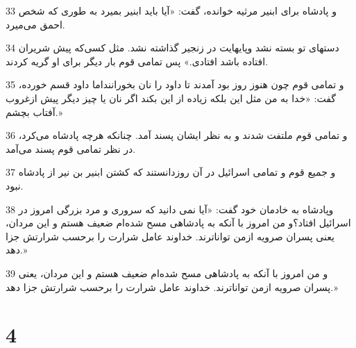 \par 33 و پادشاه برای ابنیر مرثیه خوانده، گفت: «آیا باید ابنیر بمیرد به طوری که شخص احمق می‌میرد.
\par 34 دستهای تو بسته نشد وپایهایت در زنجیر گذاشته نشد. مثل کسی‌که پیش شریران افتاده باشد افتادی.» پس تمامی قوم بار دیگر برای او گریه کردند.
\par 35 و تمامی قوم چون هنوز روز بود آمدند تا داود را نان بخوراننداما داود قسم خورده، گفت: «خدا به من مثل این بلکه زیاده از این بکند اگر نان یا چیز دیگر پیش ازغروب آفتاب بچشم.»
\par 36 و تمامی قوم ملتفت شدند و به نظر ایشان پسند آمد. چنانکه هر‌چه پادشاه می‌کرد، در نظر تمامی قوم پسند می‌آمد.
\par 37 و جمیع قوم و تمامی اسرائیل در آن روزدانستند که کشتن ابنیر بن نیر از پادشاه نبود.
\par 38 وپادشاه به خادمان خود گفت: «آیا نمی دانید که سروری و مرد بزرگی امروز در اسرائیل افتاد؟و من امروز با آنکه به پادشاهی مسح شده‌ام ضعیف هستم و این مردان، یعنی پسران صرویه ازمن تواناترند. خداوند عامل شرارت را بر‌حسب شرارتش جزا دهد.»
\par 39 و من امروز با آنکه به پادشاهی مسح شده‌ام ضعیف هستم و این مردان، یعنی پسران صرویه ازمن تواناترند. خداوند عامل شرارت را بر‌حسب شرارتش جزا دهد.»
 
\chapter{4}

